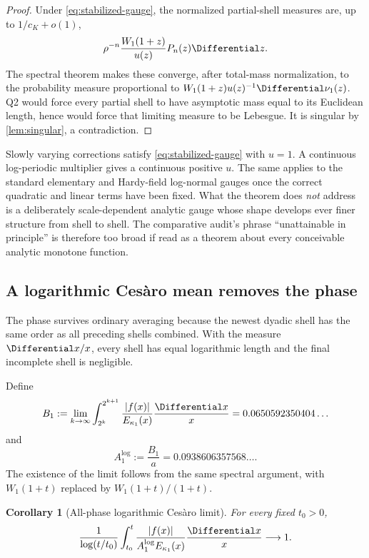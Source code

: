\documentclass[11pt,oneside]{article}
\newtheorem{corollary}[theorem]{Corollary}
\theoremstyle{definition}
\theoremstyle{remark}
\begin{document}
\begin{proof}
Under \eqref{eq:stabilized-gauge}, the normalized partial-shell measures are,
up to $1/c_K+o(1)$,
\[
 \rho^{-n}\frac{W_1(1+z)}{u(z)}P_n(z)\Differential z.
\]
The spectral theorem makes these converge, after total-mass normalization, to
the probability measure proportional to
$W_1(1+z)u(z)^{-1}\Differential\nu_1(z)$.  Q2 would force every partial shell to have
asymptotic mass equal to its Euclidean length, hence would force that limiting
measure to be Lebesgue.  It is singular by \cref{lem:singular}, a
contradiction.
\end{proof}

Slowly varying corrections satisfy \eqref{eq:stabilized-gauge} with $u=1$.
A continuous log-periodic multiplier gives a continuous positive $u$.  The
same applies to the standard elementary and Hardy-field log-normal gauges once
the correct quadratic and linear terms have been fixed.  What the theorem
does \emph{not} address is a deliberately scale-dependent analytic gauge whose
shape develops ever finer structure from shell to shell.  The comparative
audit's phrase ``unattainable in principle'' is therefore too broad if read as
a theorem about every conceivable analytic monotone function.

\subsection{A logarithmic Ces\`aro mean removes the phase}

The phase survives ordinary averaging because the newest dyadic shell has the
same order as all preceding shells combined.  With the measure $\Differential x/x$,
every shell has equal logarithmic length and the final incomplete shell is
negligible.

Define
\begin{equation}
 B_1:=\lim_{k\to\infty}
 \int_{2^k}^{2^{k+1}}
 \frac{|f(x)|}{E_{\kappa_1}(x)}\frac{\Differential x}{x}
 =0.0650592350404\ldots
 \label{eq:B1log}
\end{equation}
and
\begin{equation}
 A_1^{\log}:=\frac{B_1}{a}
 =0.0938606357568\ldots .
 \label{eq:A1log}
\end{equation}
The existence of the limit follows from the same spectral argument, with
$W_1(1+t)$ replaced by $W_1(1+t)/(1+t)$.

\begin{corollary}[All-phase logarithmic Ces\`aro limit]
\label{cor:log-Cesaro}
For every fixed $t_0>0$,
\begin{equation}
 \frac1{\log(t/t_0)}
 \int_{t_0}^{t}
 \frac{|f(x)|}{A_1^{\log}E_{\kappa_1}(x)}\frac{\Differential x}{x}
 \longrightarrow1.
 \label{eq:log-Cesaro}
\end{equation}
\end{corollary}
\end{document}
